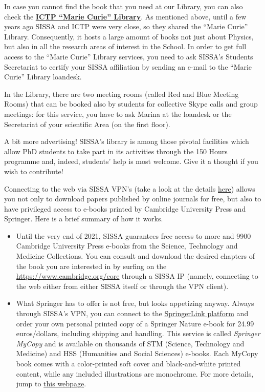 \documentclass{sissavademecum}
\begin{document}
In case you cannot find the book that you need at our Library, you can also check the \href{http://library.ictp.it/}{\textbf{ICTP ``Marie Curie'' Library}}. As mentioned above, until a few years ago SISSA and ICTP were very close, so they shared the ``Marie Curie'' Library. Consequently, it hosts a large amount of books not just about Physics, but also in all the research areas of interest in the School. In order to get full access to the ``Marie Curie'' Library services, you need to ask SISSA's Students Secretariat to certify your SISSA affiliation by sending an e-mail to the ``Marie Curie'' Library loandesk.

In the Library, there are two meeting rooms (called Red and Blue Meeting Rooms) that can be booked also by students for collective Skype calls and group meetings: for this service, you have to ask Marina at the loandesk or the Secretariat of your scientific Area (on the first floor).

A bit more advertising! SISSA's library is among those pivotal facilities which allow PhD students to take part in its activities through the 150 Hours programme and, indeed, students' help is most welcome. Give it a thought if you wish to contribute!

Connecting to the web via SISSA VPN's (take a look at the details \href{https://www.itcs.sissa.it/services/network/internal/vpnclient}{here}) allows you not only to download papers published by online journals for free, but also to have privileged access to e-books printed by Cambridge University Press and Springer. Here is a brief summary of how it works.
\begin{itemize}
    \item Until the very end of 2021, SISSA guarantees free access to more and 9900 Cambridge University Press e-books from the Science, Technology and Medicine Collections. You can consult and download the desired chapters of the book you are interested in by surfing on the \href{Cambrige Core home page}{https://www.cambridge.org/core} through a SISSA IP (namely, connecting to the web either from either SISSA itself or through the VPN client).
    \item What Springer has to offer is not free, but looks appetizing anyway. Always through SISSA's VPN, you can connect to the \href{https://link.springer.com/search?facet-content-type="Book"}{SpringerLink platform} and order your own personal printed copy of a Springer Nature e-book for 24.99 euros/dollars, including shipping and handling. This service is called \textit{Springer MyCopy} and is available on thousands of STM (Science, Technology and Medicine) and HSS (Humanities and Social Sciences) e-books. Each MyCopy book comes with a color-printed soft cover and black-and-white printed content, while any included illustrations are monochrome. For more details, jump to \href{https://www.springernature.com/gp/librarians/products/ebooks/my-copy}{this webpage}.
\end{itemize}
\end{document}
